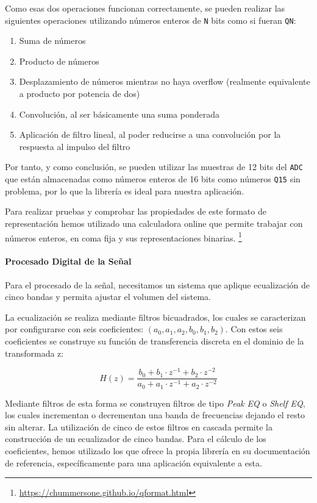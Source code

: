 Como esas dos operaciones funcionan correctamente, se pueden realizar las siguientes operaciones utilizando números enteros de \texttt{N} bits como si fueran \texttt{QN}:
\begin{enumerate}
    \item Suma de números
    \item Producto de números
    \item Desplazamiento de números mientras no haya overflow (realmente equivalente a producto por potencia de dos)
    \item Convolución, al ser básicamente una suma ponderada
    \item Aplicación de filtro lineal, al poder reducirse a una convolución por la respuesta al impulso del filtro
\end{enumerate}

Por tanto, y como conclusión, se pueden utilizar las muestras de 12 bits del \texttt{ADC} que están almacenadas como números enteros de 16 bits como números \texttt{Q15} sin problema, por lo que la librería es ideal para nuestra aplicación. 

Para realizar pruebas y comprobar las propiedades de este formato de representación hemos utilizado una calculadora online que permite trabajar con números enteros, en coma fija y sus representaciones binarias. \footnote{\url{https://chummersone.github.io/qformat.html}}

\paragraph{Procesado Digital de la Señal}

Para el procesado de la señal, necesitamos un sistema que aplique ecualización de cinco bandas y permita ajustar el volumen del sistema. 

La ecualización se realiza mediante filtros bicuadrados, los cuales se caracterizan por configurarse con seis coeficientes: $(a_0, a_1, a_2, b_0, b_1, b_2)$. Con estos seis coeficientes se construye su función de transferencia discreta en el dominio de la transformada z:

\[ H(z) = \frac{b_0 + b_1\cdot z^{-1} + b_2\cdot z^{-2}}{a_0 + a_1\cdot z^{-1} + a_2\cdot z^{-2}}\]

Mediante filtros de esta forma se construyen filtros de tipo \textit{Peak EQ} o \textit{Shelf EQ}, los cuales incrementan o decrementan una banda de frecuencias dejando el resto sin alterar. La utilización de cinco de estos filtros en cascada permite la construcción de un ecualizador de cinco bandas. Para el cálculo de los coeficientes, hemos utilizado los que ofrece la propia librería en su documentación de referencia, específicamente para una aplicación equivalente a esta. \cite{GraphicAudioEqualizer}

